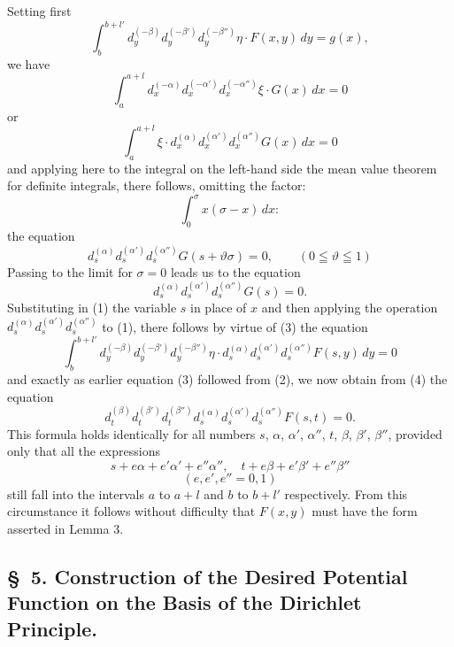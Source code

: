 \documentclass{article}
\begin{document}
Setting first
\[
\int_b^{b+l'} d_y^{(-\beta)} d_y^{(-\beta')} d_y^{(-\beta'')} \eta \cdot F(x, y)\,dy = g(x), \tag{1}
\]
we have
\[
\int_a^{a+l} d_x^{(-\alpha)} d_x^{(-\alpha')} d_x^{(-\alpha'')} \xi \cdot G(x)\,dx = 0 \tag{2}
\]
or
\[
\int_a^{a+l} \xi \cdot d_x^{(\alpha)} d_x^{(\alpha')} d_x^{(\alpha'')} G(x)\,dx = 0
\]
and applying here to the integral on the left-hand side the mean value theorem for definite integrals, there follows, omitting the factor:
\[
\int_0^\sigma x(\sigma - x)\,dx:
\]
the equation
\[
d_s^{(\alpha)} d_s^{(\alpha')} d_s^{(\alpha'')} G(s + \vartheta\sigma) = 0, \qquad (0 \leqq \vartheta \leqq 1)
\]
Passing to the limit for $\sigma = 0$ leads us to the equation
\[
d_s^{(\alpha)} d_s^{(\alpha')} d_s^{(\alpha'')} G(s) = 0. \tag{3}
\]
Substituting in (1) the variable $s$ in place of $x$ and then applying the operation $d_s^{(\alpha)} d_s^{(\alpha')} d_s^{(\alpha'')}$ to (1), there follows by virtue of (3) the equation
\[
\int_b^{b+l'} d_y^{(-\beta)} d_y^{(-\beta')} d_y^{(-\beta'')} \eta \cdot d_s^{(\alpha)} d_s^{(\alpha')} d_s^{(\alpha'')} F(s, y)\,dy = 0
\]
and exactly as earlier equation (3) followed from (2), we now obtain from (4) the equation
\[
d_t^{(\beta)} d_t^{(\beta')} d_t^{(\beta'')} d_s^{(\alpha)} d_s^{(\alpha')} d_s^{(\alpha'')} F(s, t) = 0.
\]
This formula holds identically for all numbers $s$, $\alpha$, $\alpha'$, $\alpha''$, $t$, $\beta$, $\beta'$, $\beta''$, provided only that all the expressions
\[
s + e\alpha + e'\alpha' + e''\alpha'', \quad t + e\beta + e'\beta' + e''\beta''
\]
\[
(e, e', e'' = 0, 1)
\]
still fall into the intervals $a$ to $a+l$ and $b$ to $b+l'$ respectively. From this circumstance it follows without difficulty that $F(x, y)$ must have the form asserted in Lemma 3.


\subsection*{§~5. Construction of the Desired Potential Function on the Basis of the Dirichlet Principle.}
\end{document}
